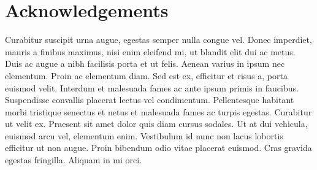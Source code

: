 \chapter{Acknowledgements}

Curabitur suscipit urna augue, egestas semper nulla congue vel. Donec imperdiet, mauris
a finibus maximus, nisi enim eleifend mi, ut blandit elit dui ac metus. Duis ac augue a
nibh facilisis porta et ut felis. Aenean varius in ipsum nec elementum. Proin ac elementum
diam. Sed est ex, efficitur et risus a, porta euismod velit. Interdum et malesuada fames
ac ante ipsum primis in faucibus. Suspendisse convallis placerat lectus vel condimentum.
Pellentesque habitant morbi tristique senectus et netus et malesuada fames ac turpis egestas.
Curabitur ut velit ex. Praesent sit amet dolor quis diam cursus sodales. Ut at dui vehicula,
euismod arcu vel, elementum enim. Vestibulum id nunc non lacus lobortis efficitur ut non
augue. Proin bibendum odio vitae placerat euismod. Cras gravida egestas fringilla. Aliquam
in mi orci.